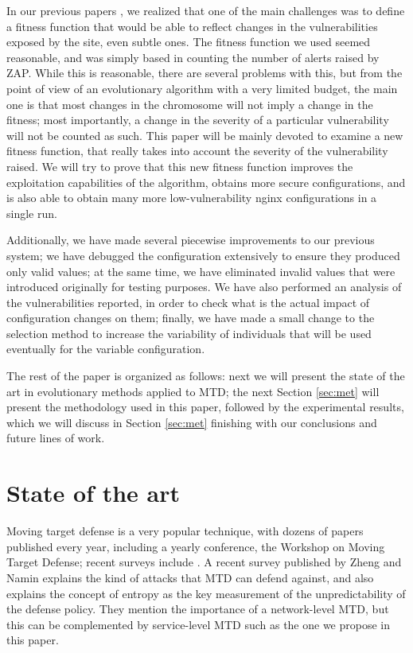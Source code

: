 \documentclass[sigconf]{acmart}
\begin{document}
In our previous papers \cite{erseco:evostar:anon,erseco:cec}, we realized that one of the main challenges
was to define a fitness function that would be able to reflect changes
in the vulnerabilities exposed by the site, even subtle ones. The
fitness function we used seemed reasonable, and was simply based in
counting the number of alerts raised by ZAP. While this is reasonable,
there are several problems with this, but from the point of view of an
evolutionary algorithm with a very limited budget, the main one is
that most changes in the chromosome will not imply a change in the
fitness; most importantly, a change in the severity of a particular
vulnerability will not be counted as such. This paper will be mainly
devoted to examine a new fitness function, that really takes into
account the severity of the vulnerability raised. We will try to prove
that this new fitness function improves the exploitation capabilities
of the algorithm, obtains more secure configurations, and is also able
to obtain many more low-vulnerability {\sf nginx} configurations in a
single run.

Additionally, we have made several piecewise improvements to our
previous system; we have debugged the configuration extensively to
ensure they produced only valid values; at the same time, we have
eliminated invalid values that were introduced originally for testing
purposes. We have also performed an analysis of the vulnerabilities
reported, in order to check what is the actual impact of configuration
changes on them; finally, we have made a small change to the selection
method to increase the variability of individuals that will be used
eventually for the variable configuration.

The rest of the paper is organized as follows: next we will present
the state of the art in evolutionary methods applied to MTD; the next
Section \ref{sec:met} will present the methodology used in this paper,
followed by the experimental results, which we will discuss in Section \ref{sec:met}
finishing with our conclusions and future lines of work.

\section{State of the art}
\label{sec:soa}


Moving target defense is a very popular technique, with dozens of
papers published every year, including a yearly conference, the
Workshop on Moving Target Defense; recent surveys include
\cite{Larsen201428,lei2018moving,ward2018survey,cho2019toward}. A
recent survey published by Zheng and Namin \cite{Zheng2019207}
explains the kind of attacks that MTD can defend against, and also
explains the concept of entropy as the key measurement of the
unpredictability of the defense policy. They mention the importance of
a network-level MTD, but this can be complemented by service-level MTD
such as the one we propose in this paper.
\end{document}
